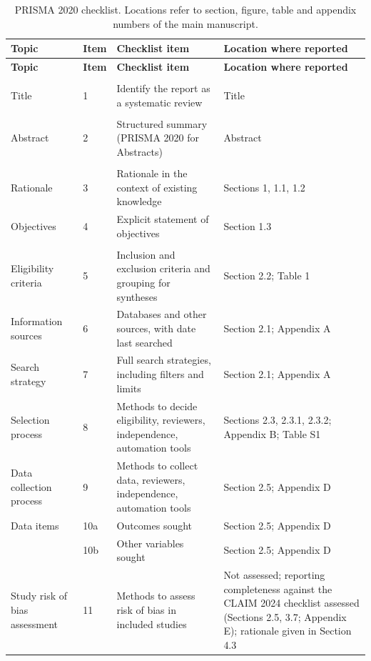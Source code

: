 \begin{longtable}{>{\raggedright\arraybackslash}p{3.6cm} l >{\raggedright\arraybackslash}p{6.2cm} >{\raggedright\arraybackslash}p{5.2cm}}
\caption{PRISMA 2020 checklist. Locations refer to section, figure, table and appendix numbers of the main manuscript.}\label{tab:prisma_checklist}\\
\toprule
\textbf{Topic} & \textbf{Item} & \textbf{Checklist item} & \textbf{Location where reported}\\
\midrule\endfirsthead
\toprule
\textbf{Topic} & \textbf{Item} & \textbf{Checklist item} & \textbf{Location where reported}\\
\midrule\endhead
\bottomrule\endfoot
\multicolumn{4}{l}{\textbf{TITLE}}\\
Title & 1 & Identify the report as a systematic review & Title\\
\multicolumn{4}{l}{\textbf{ABSTRACT}}\\
Abstract & 2 & Structured summary (PRISMA 2020 for Abstracts) & Abstract\\
\multicolumn{4}{l}{\textbf{INTRODUCTION}}\\
Rationale & 3 & Rationale in the context of existing knowledge & Sections 1, 1.1, 1.2\\
Objectives & 4 & Explicit statement of objectives & Section 1.3\\
\multicolumn{4}{l}{\textbf{METHODS}}\\
Eligibility criteria & 5 & Inclusion and exclusion criteria and grouping for syntheses & Section 2.2; Table 1\\
Information sources & 6 & Databases and other sources, with date last searched & Section 2.1; Appendix A\\
Search strategy & 7 & Full search strategies, including filters and limits & Section 2.1; Appendix A\\
Selection process & 8 & Methods to decide eligibility, reviewers, independence, automation tools & Sections 2.3, 2.3.1, 2.3.2; Appendix B; Table S1\\
Data collection process & 9 & Methods to collect data, reviewers, independence, automation tools & Section 2.5; Appendix D\\
Data items & 10a & Outcomes sought & Section 2.5; Appendix D\\
 & 10b & Other variables sought & Section 2.5; Appendix D\\
Study risk of bias assessment & 11 & Methods to assess risk of bias in included studies & Not assessed; reporting completeness against the CLAIM 2024 checklist assessed (Sections 2.5, 3.7; Appendix E); rationale given in Section 4.3\\

\end{longtable}
